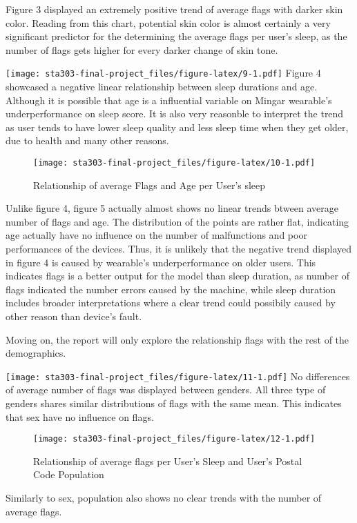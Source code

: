 \documentclass[
          english,
          paper=a4,
              ,captions=tableheading
  ]{scrartcl}
\begin{document}
Figure 3 displayed an extremely positive trend of average flags with
darker skin color. Reading from this chart, potential skin color is
almost certainly a very significant predictor for the determining the
average flags per user's sleep, as the number of flags gets higher for
every darker change of skin tone.

\texttt{[image: sta303-final-project\_files/figure-latex/9-1.pdf]} Figure
4 showcased a negative linear relationship between sleep durations and
age. Although it is possible that age is a influential variable on
Mingar wearable's underperformance on sleep score. It is also very
reasonble to interpret the trend as user tends to have lower sleep
quality and less sleep time when they get older, due to health and many
other reasons.

\begin{figure}
\centering
\texttt{[image: sta303-final-project\_files/figure-latex/10-1.pdf]}
\caption{Relationship of average Flags and Age per User's sleep}
\end{figure}

Unlike figure 4, figure 5 actually almost shows no linear trends btween
average number of flags and age. The distribution of the points are
rather flat, indicating age actually have no influence on the number of
malfunctions and poor performances of the devices. Thus, it is unlikely
that the negative trend displayed in figure 4 is caused by wearable's
underperformance on older users. This indicates flags is a better output
for the model than sleep duration, as number of flags indicated the
number errors caused by the machine, while sleep duration includes
broader interpretations where a clear trend could possibily caused by
other reason than device's fault.

Moving on, the report will only explore the relationship flags with the
rest of the demographics.

\texttt{[image: sta303-final-project\_files/figure-latex/11-1.pdf]} No
differences of average number of flags was displayed between genders.
All three type of genders shares similar distributions of flags with the
same mean. This indicates that sex have no influence on flags.

\begin{figure}
\centering
\texttt{[image: sta303-final-project\_files/figure-latex/12-1.pdf]}
\caption{Relationship of average flags per User's Sleep and User's
Postal Code Population}
\end{figure}

Similarly to sex, population also shows no clear trends with the number
of average flags.
\end{document}
